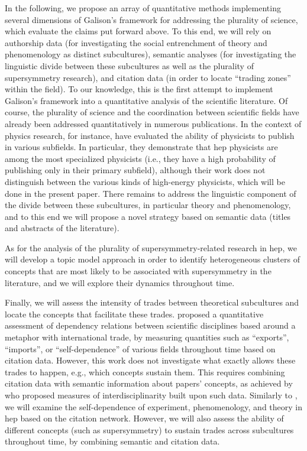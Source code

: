 \documentclass[smallextended]{svjour3}
\begin{document}
In the following, we propose an array of quantitative methods implementing several dimensions of Galison's framework for addressing the plurality of science, which evaluate the claims put forward above. To this end, we will rely on authorship data (for investigating the social entrenchment of theory and phenomenology as distinct subcultures), semantic analyses (for investigating the linguistic divide between these subcultures as well as the plurality of supersymmetry research), and citation data (in order to locate ``trading zones'' within the field). To our knowledge, this is the first attempt to implement Galison's framework into a quantitative analysis of the scientific literature. Of course, the plurality of science and the coordination between scientific fields have already been addressed quantitatively in numerous publications. In the context of physics research, for instance, \citet{Battiston2019} have evaluated the ability of physicists to publish in various subfields. In particular, they demonstrate that \gls{hep} physicists are among the most specialized physicists (i.e., they have a high probability of publishing only in their primary subfield), although their work does not distinguish between the various kinds of high-energy physicists, which will be done in the present paper. There remains to address the linguistic component of the divide between these subcultures, in particular theory and phenomenology, and to this end we will propose a novel strategy based on semantic data (titles and abstracts of the literature).

As for the analysis of the plurality of supersymmetry-related research in \gls{hep}, we will develop a topic model approach in order to identify heterogeneous clusters of concepts that are most likely to be associated with supersymmetry in the literature, and we will explore their dynamics throughout time.

Finally, we will assess the intensity of trades between theoretical subcultures and locate the concepts that facilitate these trades. \citet{Yan2013} proposed a quantitative assessment of dependency relations between scientific disciplines based around a metaphor with international trade, by measuring quantities such as ``exports'', ``imports'', or ``self-dependence'' of various fields throughout time based on citation data. However, this work does not investigate what exactly allows these trades to happen, e.g., which concepts sustain them. This requires combining citation data with semantic information about papers' concepts, as achieved by \citet{Raimbault2019} who proposed measures of interdisciplinarity built upon such data. Similarly to \citealt{Yan2013}, we will examine the self-dependence of experiment, phenomenology, and theory in \gls{hep} based on the citation network. However, we will also assess the ability of different concepts (such as supersymmetry) to sustain trades across subcultures throughout time, by combining semantic and citation data.
\end{document}
